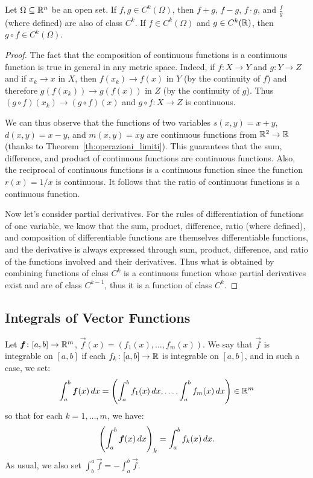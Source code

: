 \begin{theorem}
Let $\Omega \subseteq {\mathbb R}^n$ be an open set.
If $f,g\in C^k(\Omega)$, then $f+g$, $f-g$, $f\cdot g$, and $\frac{f}{g}$
(where defined) are also of class $C^k$. If $f\in C^k(\Omega)$ and $g\in
C^k({\mathbb R})$,
then $g\circ f \in C^k(\Omega)$.
\end{theorem}
%
\begin{proof}
The fact that the composition of continuous functions is a continuous function
is true in general in any metric space.
Indeed, if $f\colon X\to Y$ and $g\colon Y \to Z$ and if $x_k\to x$ in $X$,
then $f(x_k) \to f(x)$ in $Y$ (by the continuity of $f$)
and therefore $g(f(x_k)) \to g(f(x))$ in $Z$ (by the continuity of $g$).
Thus $(g \circ f)(x_k) \to (g\circ f)(x)$ and $g\circ f\colon X\to Z$ is
continuous.

We can thus observe that the functions of two variables $s(x,y) = x+y$,
$d(x,y)=x-y$, and
$m(x,y)=xy$ are continuous functions from ${\mathbb R}^2\to {\mathbb R}$ 
(thanks to Theorem~\ref{th:operazioni_limiti}). 
This guarantees
that the sum, difference, and product of continuous functions are continuous
functions.
Also, the reciprocal of continuous functions is a continuous function
since the function $r(x)=1/x$ is continuous.
It follows that the ratio of continuous functions is a
continuous function.

Now let's consider partial derivatives.
For the rules of differentiation of functions of one variable, we know that
the sum, product, difference, ratio (where defined), and composition
of differentiable functions are
themselves differentiable functions, and the derivative is always expressed
through
sum, product, difference, and ratio of the functions involved and their
derivatives. Thus what is obtained by combining functions
of class $C^k$ is a continuous function whose partial derivatives exist and
are of class $C^{k-1}$, thus it is a function of class $C^k$.
\end{proof}

\subsection{Integrals of Vector Functions}

\begin{definition}
Let $\boldsymbol f\colon [a,b]\to {\mathbb R}^m$, $\vec f(x) = (f_1(x), \dots, f_m(x))$.
We say that $\vec f$ is integrable on $[a,b]$ if each
$f_k\colon[a,b]\to {\mathbb R}$ is integrable on $[a,b]$, and in such a case, we set:
\[
  \int_a^b \boldsymbol f(x)\, dx
  = {\left( \int_a^b f_1(x)\, dx, \dots, \int_a^b f_m(x)\, dx \right)}
  \in {\mathbb R}^m
\]
so that for each $k=1,\dots, m$, we have:
\[
  {\left( \int_a^b \boldsymbol f(x)\, dx \right)}_k = \int_a^b f_k(x)\, dx.
\]
As usual, we also set $\int_b^a \vec f = - \int_a^b \vec f$.
\end{definition}

